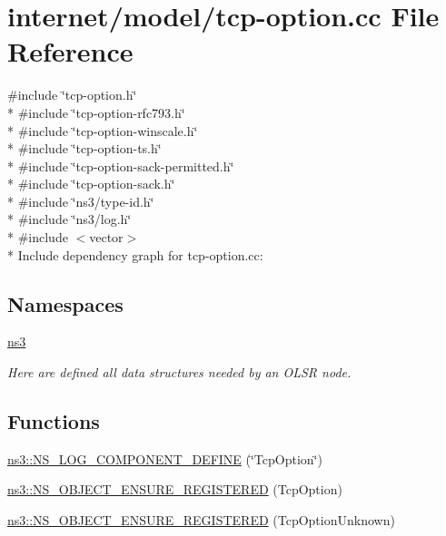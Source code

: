 \hypertarget{tcp-option_8cc}{}\section{internet/model/tcp-\/option.cc File Reference}
\label{tcp-option_8cc}
{\ttfamily \#include \char`\"{}tcp-\/option.\+h\char`\"{}}\\*
{\ttfamily \#include \char`\"{}tcp-\/option-\/rfc793.\+h\char`\"{}}\\*
{\ttfamily \#include \char`\"{}tcp-\/option-\/winscale.\+h\char`\"{}}\\*
{\ttfamily \#include \char`\"{}tcp-\/option-\/ts.\+h\char`\"{}}\\*
{\ttfamily \#include \char`\"{}tcp-\/option-\/sack-\/permitted.\+h\char`\"{}}\\*
{\ttfamily \#include \char`\"{}tcp-\/option-\/sack.\+h\char`\"{}}\\*
{\ttfamily \#include \char`\"{}ns3/type-\/id.\+h\char`\"{}}\\*
{\ttfamily \#include \char`\"{}ns3/log.\+h\char`\"{}}\\*
{\ttfamily \#include $<$vector$>$}\\*
Include dependency graph for tcp-\/option.cc\+:
\subsection*{Namespaces}
\begin{DoxyCompactItemize}
\item 
 \hyperlink{namespacens3}{ns3}
\begin{DoxyCompactList}\small\item\em Here are defined all data structures needed by an O\+L\+SR node. \end{DoxyCompactList}\end{DoxyCompactItemize}
\subsection*{Functions}
\begin{DoxyCompactItemize}
\item 
\hyperlink{namespacens3_a1ef9b9a25325ecbe993162deb76464cd}{ns3\+::\+N\+S\+\_\+\+L\+O\+G\+\_\+\+C\+O\+M\+P\+O\+N\+E\+N\+T\+\_\+\+D\+E\+F\+I\+NE} (\char`\"{}Tcp\+Option\char`\"{})
\item 
\hyperlink{namespacens3_a90f684ae2627c19537ed6011f6cc59c6}{ns3\+::\+N\+S\+\_\+\+O\+B\+J\+E\+C\+T\+\_\+\+E\+N\+S\+U\+R\+E\+\_\+\+R\+E\+G\+I\+S\+T\+E\+R\+ED} (Tcp\+Option)
\item 
\hyperlink{namespacens3_aba7ec55076880169c459a615e0c9982a}{ns3\+::\+N\+S\+\_\+\+O\+B\+J\+E\+C\+T\+\_\+\+E\+N\+S\+U\+R\+E\+\_\+\+R\+E\+G\+I\+S\+T\+E\+R\+ED} (Tcp\+Option\+Unknown)
\end{DoxyCompactItemize}
